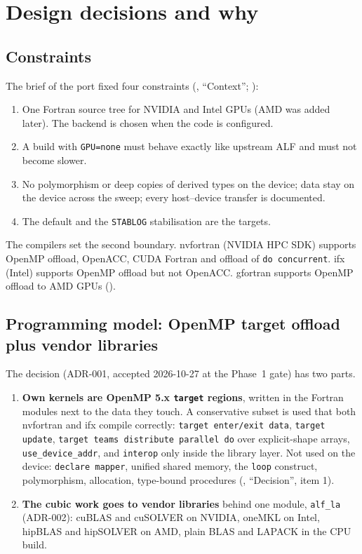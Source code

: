 \section{Design decisions and why}
\label{sec:design}

\subsection{Constraints}

The brief of the port fixed four constraints (, ``Context''; ):
\begin{enumerate}
\item One Fortran source tree for NVIDIA and Intel GPUs (AMD was added later). The backend is chosen when the code is configured.
\item A build with \texttt{GPU=none} must behave exactly like upstream ALF and must not become slower.
\item No polymorphism or deep copies of derived types on the device; data stay on the device across the sweep; every host--device transfer is documented.
\item The default and the \texttt{STABLOG} stabilisation are the targets.
\end{enumerate}
The compilers set the second boundary. nvfortran (NVIDIA HPC SDK) supports OpenMP offload, OpenACC, CUDA Fortran and offload of \texttt{do concurrent}. ifx (Intel) supports OpenMP offload but not OpenACC. gfortran supports OpenMP offload to AMD GPUs ().

\subsection{Programming model: OpenMP target offload plus vendor libraries}

The decision (ADR-001, accepted 2026-10-27 at the Phase~1 gate) has two parts. %
\begin{enumerate}
\item \textbf{Own kernels are OpenMP 5.x \texttt{target} regions}, written in the Fortran modules next to the data they touch. A conservative subset is used that both nvfortran and ifx compile correctly: \texttt{target enter/exit data}, \texttt{target update}, \texttt{target teams distribute parallel do} over explicit-shape arrays, \texttt{use\_device\_addr}, and \texttt{interop} only inside the library layer. Not used on the device: \texttt{declare mapper}, unified shared memory, the \texttt{loop} construct, polymorphism, allocation, type-bound procedures (, ``Decision'', item 1).
\item \textbf{The cubic work goes to vendor libraries} behind one module, \texttt{alf\_la} (ADR-002): cuBLAS and cuSOLVER on NVIDIA, oneMKL on Intel, hipBLAS and hipSOLVER on AMD, plain BLAS and LAPACK in the CPU build.
\end{enumerate}

